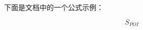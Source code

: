 \documentclass{article} %
\author{作者姓名}
\date{} %
\begin{document}
\maketitle

下面是文档中的一个公式示例：

\[
S_{POI}
\]
\end{document}

